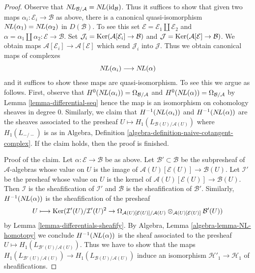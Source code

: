 \begin{proof}
Observe that $\mathop{N\!L}\nolimits_{\mathcal{B}/\mathcal{A}} = \mathop{N\!L}\nolimits(\text{id}_\mathcal{B})$.
Thus it suffices to show that given two maps
$\alpha_i : \mathcal{E}_i \to \mathcal{B}$ as above, there is a
canonical quasi-isomorphism $\mathop{N\!L}\nolimits(\alpha_1) = \mathop{N\!L}\nolimits(\alpha_2)$ in $D(\mathcal{B})$.
To see this set $\mathcal{E} = \mathcal{E}_1 \amalg \mathcal{E}_2$ and
$\alpha = \alpha_1 \amalg \alpha_2 : \mathcal{E} \to \mathcal{B}$.
Set
$\mathcal{J}_i = \mathop{\mathrm{Ker}}(\mathcal{A}[\mathcal{E}_i] \to \mathcal{B})$
and
$\mathcal{J} = \mathop{\mathrm{Ker}}(\mathcal{A}[\mathcal{E}] \to \mathcal{B})$.
We obtain maps $\mathcal{A}[\mathcal{E}_i] \to \mathcal{A}[\mathcal{E}]$
which send $\mathcal{J}_i$ into $\mathcal{J}$.
Thus we obtain canonical maps of complexes
$$
\mathop{N\!L}\nolimits(\alpha_i) \longrightarrow \mathop{N\!L}\nolimits(\alpha)
$$
and it suffices to show these maps are quasi-isomorphism. To see this
we argue as follows. First, observe that
$H^0(\mathop{N\!L}\nolimits(\alpha_i)) = \Omega_{\mathcal{B}/\mathcal{A}}$ and
$H^0(\mathop{N\!L}\nolimits(\alpha)) = \Omega_{\mathcal{B}/\mathcal{A}}$ by
Lemma \ref{lemma-differential-seq}
hence the map is an isomorphism on cohomology sheaves in degree $0$.
Similarly, we claim that $H^{-1}(\mathop{N\!L}\nolimits(\alpha_i))$ and $H^{-1}(\mathop{N\!L}\nolimits(\alpha))$
are the sheaves associated to the presheaf
$U \mapsto H_1(L_{\mathcal{B}(U)/\mathcal{A}(U)})$ where
$H_1(L_{-/-})$ is as in
Algebra, Definition \ref{algebra-definition-naive-cotangent-complex}.
If the claim holds, then the proof is finished.

\medskip\noindent
Proof of the claim. Let $\alpha : \mathcal{E} \to \mathcal{B}$
be as above. Let $\mathcal{B}' \subset \mathcal{B}$ be the subpresheaf
of $\mathcal{A}$-algebras whose value on $U$ is the image of
$\mathcal{A}(U)[\mathcal{E}(U)] \to \mathcal{B}(U)$. Let $\mathcal{I}'$
be the presheaf whose value on $U$ is the kernel of
$\mathcal{A}(U)[\mathcal{E}(U)] \to \mathcal{B}(U)$. Then $\mathcal{I}$
is the sheafification of $\mathcal{I}'$ and $\mathcal{B}$ is
the sheafification of $\mathcal{B}'$. Similarly,
$H^{-1}(\mathop{N\!L}\nolimits(\alpha))$ is the sheafification of the presheaf
$$
U \longmapsto
\mathop{\mathrm{Ker}}(\mathcal{I}'(U)/\mathcal{I}'(U)^2 \to
\Omega_{\mathcal{A}(U)[\mathcal{E}(U)]/\mathcal{A}(U)}
\otimes_{\mathcal{A}(U)[\mathcal{E}(U)]} \mathcal{B}'(U))
$$
by Lemma \ref{lemma-differentials-sheafify}.
By Algebra, Lemma \ref{algebra-lemma-NL-homotopy} we conclude
$H^{-1}(\mathop{N\!L}\nolimits(\alpha))$ is the sheaf associated to the presheaf
$U \mapsto H_1(L_{\mathcal{B}'(U)/\mathcal{A}(U)})$. Thus we have
to show that the maps
$H_1(L_{\mathcal{B}'(U)/\mathcal{A}(U)}) \to
H_1(L_{\mathcal{B}(U)/\mathcal{A}(U)})$ induce an isomorphism
$\mathcal{H}'_1 \to \mathcal{H}_1$ of sheafifications.


\end{proof}

